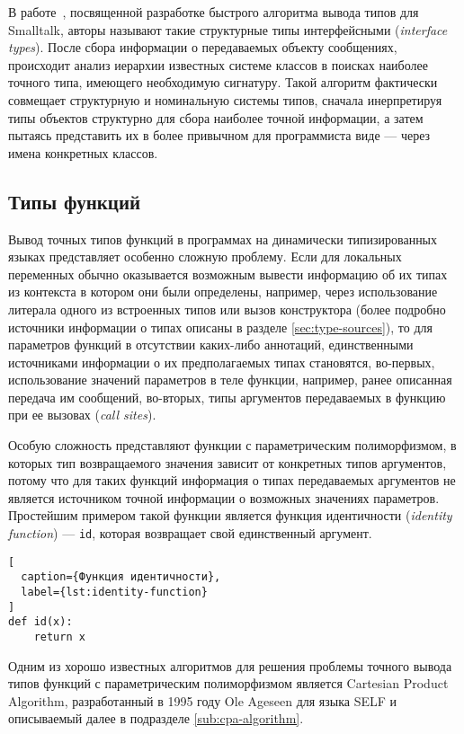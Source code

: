 В работе~\cite{Pluquet2009}, посвященной разработке быстрого алгоритма вывода
типов для Smalltalk, авторы называют такие структурные типы интерфейсными 
(\emph{interface types}). После сбора информации о передаваемых объекту сообщениях,
происходит анализ иерархии известных системе классов в поисках наиболее
точного типа, имеющего необходимую сигнатуру. Такой алгоритм фактически
совмещает структурную и номинальную системы типов, сначала инерпретируя типы
объектов структурно для сбора наиболее точной информации, а затем пытаясь
представить их в более привычном для программиста виде --- через имена
конкретных классов.

\subsection{Типы функций}

Вывод точных типов функций в программах на динамически типизированных языках
представляет особенно сложную проблему. Если для локальных переменных обычно
оказывается возможным вывести информацию об их типах из контекста в котором они
были определены, например, через использование литерала одного из встроенных
типов или вызов конструктора (более подробно источники информации о типах
описаны в разделе \ref{sec:type-sources}), то для параметров функций в
отсутствии каких-либо аннотаций, единственными источниками информации о их
предполагаемых типах становятся, во-первых, использование значений параметров в
теле функции, например, ранее описанная передача им сообщений, во-вторых, типы
аргументов передаваемых в функцию при ее вызовах (\emph{call sites}).

Особую сложность представляют функции с параметрическим полиморфизмом, в
которых тип возвращаемого значения зависит от конкретных типов аргументов, 
потому что для таких функций информация о типах передаваемых аргументов не
является источником точной информации о возможных значениях параметров.
Простейшим примером такой функции является функция идентичности (\emph{identity
function}) --- \texttt{id}, которая возвращает свой единственный аргумент.

\begin{lstlisting}[
  caption={Функция идентичности},
  label={lst:identity-function}
]
def id(x):
    return x
\end{lstlisting}

Одним из хорошо известных алгоритмов для решения проблемы точного вывода типов
функций с параметрическим полиморфизмом является Cartesian Product Algorithm, 
разработанный в 1995 году Ole Ageseen для языка SELF и описываемый далее в
подразделе \ref{sub:cpa-algorithm}.

